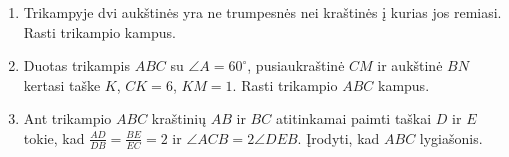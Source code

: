 \begin{enumerate}
  \item Trikampyje dvi aukštinės yra ne trumpesnės nei kraštinės į kurias jos
    remiasi. Rasti trikampio kampus. 
  \item Duotas trikampis $ABC$ su $\angle A = 60^\circ$, pusiaukraštinė $CM$
    ir aukštinė $BN$ kertasi taške $K$, $CK=6$, $KM=1$. Rasti trikampio $ABC$
    kampus.
  \item Ant trikampio $ABC$ kraštinių $AB$ ir $BC$ atitinkamai paimti taškai
    $D$ ir $E$ tokie, kad $\frac{AD}{DB} =\frac{BE}{EC}=2$ ir $\angle ACB
    =2\angle DEB$. Įrodyti, kad $ABC$ lygiašonis.
\end{enumerate}

